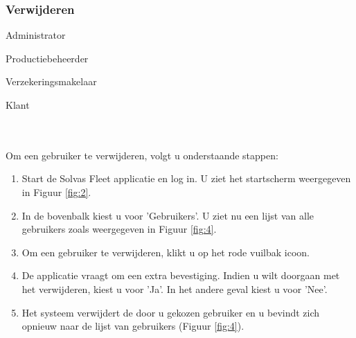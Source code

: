 \documentclass[11pt,openany]{article}
\newcommand{\cmark}{\ding{51}}%
\newcommand{\xmark}{\ding{55}}%
\newcommand{\done}{\rlap{$\square$}{\raisebox{2pt}{\large\hspace{1pt}\cmark}}%
	\hspace{-2.5pt}}
\newcommand{\wontfix}{\rlap{$\square$}{\large\hspace{1pt}\xmark}}
\begin{document}
\subsubsection{Verwijderen}
\begin{todolist}
	\item[\done] Administrator
	\item[\wontfix] Productiebeheerder
	\item[\wontfix] Verzekeringsmakelaar
	\item[\wontfix] Klant 
\end{todolist}
\\
\\
Om een gebruiker te verwijderen, volgt u onderstaande stappen:
\begin{enumerate}
	\item Start de Solvas Fleet applicatie en log in. U ziet het startscherm weergegeven in Figuur \ref{fig:2}.
	\item In de bovenbalk kiest u voor 'Gebruikers'. U ziet nu een lijst van alle gebruikers zoals weergegeven in Figuur \ref{fig:4}.
	\item Om een gebruiker te verwijderen, klikt u op het rode vuilbak icoon.
	\item De applicatie vraagt om een extra bevestiging. Indien u wilt doorgaan met het verwijderen, kiest u voor 'Ja'. In het andere geval kiest u voor 'Nee'.
	\item Het systeem verwijdert de door u gekozen gebruiker en u bevindt zich opnieuw naar de lijst van gebruikers (Figuur \ref{fig:4}).
\end{enumerate}
\end{document}
